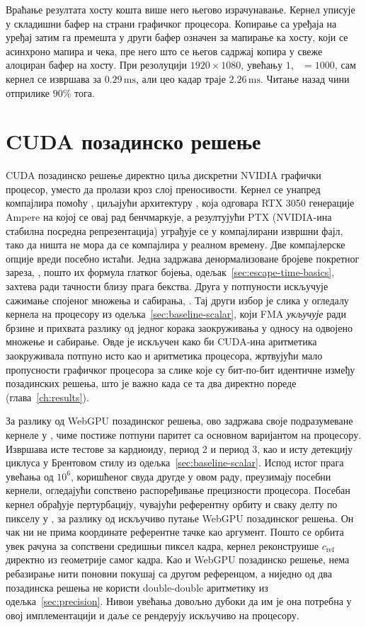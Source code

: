 \documentclass[serbian]{ftndiplomski}
\begin{document}
Враћање резултата хосту кошта више него његово израчунавање. Кернел уписује у
складишни бафер на страни графичког процесора. Копирање са уређаја на уређај затим га
премешта у други бафер означен за мапирање ка хосту, који се асинхроно мапира и чека,
пре него што се његов садржај копира у свеже алоциран бафер на хосту. При резолуцији
$1920\times1080$, увећању $1$, ~$=1000$, сам кернел се извршава за
$0.29\,\mathrm{ms}$, али цео кадар траје $2.26\,\mathrm{ms}$. Читање назад чини
отприлике $90\%$ тога.

\section{CUDA позадинско решење}
\label{sec:cuda}

CUDA позадинско решење директно циља дискретни NVIDIA графички процесор, уместо да
пролази кроз слој преносивости. Кернел се унапред компајлира помоћу ,
циљајући архитектуру , која одговара RTX 3050 генерације Ampere на којој
се овај рад бенчмаркује, а резултујући PTX (NVIDIA-ина стабилна посредна репрезентација)
уграђује се у компајлирани извршни фајл,
тако да ништа не мора да се компајлира у реалном времену. Две компајлерске опције
вреди посебно истаћи. Једна задржава денормализоване бројеве покретног зареза,
, пошто их формула глатког бојења, одељак~\ref{sec:escape-time-basics},
захтева ради тачности близу прага бекства. Друга у потпуности искључује сажимање
спојеног множења и сабирања, . Тај други избор је слика у огледалу
кернела на процесору из одељка~\ref{sec:baseline-scalar}, који FMA \emph{укључује}
ради брзине и прихвата разлику од једног корака заокруживања у односу на одвојено
множење и сабирање. Овде је искључен како би CUDA-ина аритметика заокруживала потпуно
исто као и аритметика процесора, жртвујући мало пропусности графичког процесора за
слике које су бит-по-бит идентичне између позадинских решења, што је важно када се та
два директно пореде (глава~\ref{ch:results}).

За разлику од WebGPU позадинског решења, ово задржава своје подразумеване кернеле у
, чиме постиже потпуни паритет са основном варијантом на процесору. Извршава
исте тестове за кардиоиду, период 2 и период 3, као и исту детекцију циклуса у
Брентовом стилу из одељка~\ref{sec:baseline-scalar}. Испод истог прага увећања од
$10^6$, коришћеног свуда другде у овом раду, преузимају посебни  кернели,
огледајући сопствено распоређивање прецизности процесора. Посебан кернел обрађује
пертурбацију, чувајући референтну орбиту и сваку делту по пикселу у , за
разлику од искључиво  путање WebGPU позадинског решења. Он чак ни не прима
координате референтне тачке као аргумент. Пошто се орбита увек рачуна за сопствени
средишњи пиксел кадра, кернел реконструише $c_{\mathrm{ref}}$ директно из геометрије
самог кадра. Као и WebGPU позадинско решење, нема ребазирање нити поновни покушај са
другом референцом, а ниједно од два позадинска решења не користи double-double
аритметику из одељка~\ref{sec:precision}. Нивои увећања довољно дубоки да им је она
потребна у овој имплементацији и даље се рендерују искључиво на процесору.
\end{document}
